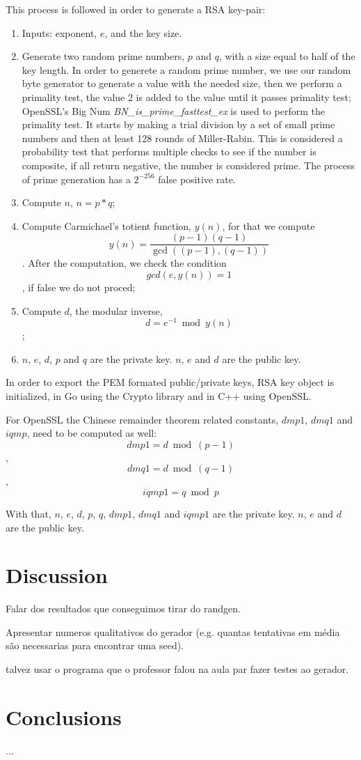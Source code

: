 \documentclass{article} %
\begin{document}
This process is followed in order to generate a RSA key-pair:
\begin{enumerate}
  \item Inputs: exponent, $e$, and the key size.
  \item Generate two random prime numbers, $p$ and $q$, with a size equal to half of the key length.
  In order to generete a random prime number, we use our random byte generator to generate
  a value with the needed size, then we perform a primality test, the value 2 is added to the value until it passes primality test;
  OpenSSL's Big Num \textit{BN\_is\_prime\_fasttest\_ex} is used to perform the primality test. It starts by making a trial division by a set of
  small prime numbers and then at least 128 rounds of Miller-Rabin. This is considered a probability
  test that performs multiple checks to see if the number is composite, if all return negative, the number is considered prime. The process of 
  prime generation has a $2^{-256}$ false positive rate.
  \item Compute $n$, $n=p*q$;
  \item Compute Carmichael's totient function, $y(n)$, for that we compute $$y(n)=\frac{(p-1)(q-1)}{\gcd((p-1),(q-1))}$$.
  After the computation, we check the condition $$gcd(e, y(n)) = 1$$, if false we do not proced;
  \item Compute $d$, the modular inverse, $$d=e^{-1} \bmod{y(n)}$$;
  \item $n$, $e$, $d$, $p$ and $q$ are the private key. $n$, $e$ and $d$ are the public key.
\end{enumerate}

In order to export the PEM formated public/private keys, RSA key object is initialized, in Go using the Crypto library and in C++ using OpenSSL.

For OpenSSL the Chinese remainder theorem related constants, $dmp1$, $dmq1$ and $iqmp$, need to be computed as well:
$$dmp1=d \bmod{(p-1)}$$, $$dmq1=d \bmod{(q-1)}$$, $$iqmp1=q \bmod{p}$$

With that, $n$, $e$, $d$, $p$, $q$, $dmp1$, $dmq1$ and $iqmp1$ are the private key. $n$, $e$ and $d$ are the public key.

\section{Discussion}
Falar dos resultados que conseguimos tirar do randgen.

Apresentar numeros qualitativos do gerador (e.g. quantas tentativas em média são necessarias para encontrar uma seed).

talvez usar o programa que o professor falou na aula par fazer testes ao gerador.


\section{Conclusions}
...
\end{document}
